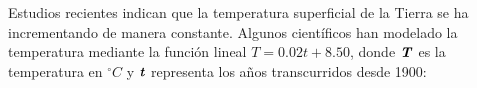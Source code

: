 \documentclass[10pt]{exam}
\begin{document}
\begin{questions}
    \question Estudios recientes indican que la temperatura superficial de la Tierra se ha incrementando de manera constante. Algunos científicos han modelado la temperatura mediante la función lineal $T=0.02t+8.50$, donde $\textbf{\textit{T}}$ es la temperatura en $^{\circ}C$ y $\textbf{\textit{t}}$ representa los años transcurridos desde 1900:
    



\end{questions}
\end{document}
